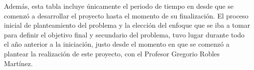 \documentclass[a4paper, spanish, 12pt]{book}
\begin{document}
Adem\'as, esta tabla incluye \'unicamente el periodo de tiempo en desde que se
comenz\'o a desarrollar el proyecto hasta el momento de su finalizaci\'on.
El proceso inicial de planteamiento del problema y la elecci\'on del enfoque
que se iba a tomar para definir el objetivo final y secundario del problema, tuvo
lugar durante todo el a\~no anterior a la iniciaci\'on, justo desde el momento en
que se comenz\'o a plantear la realizaci\'on de este proyecto, con el Profesor
Gregorio Robles Mart\'inez.


\cleardoublepage


\end{document}
